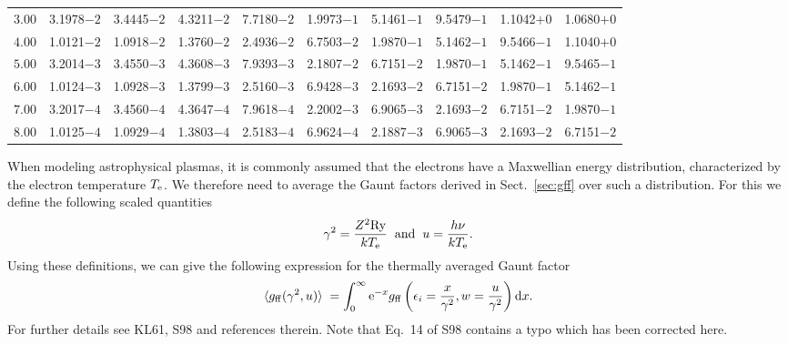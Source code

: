 \documentclass[useAMS,usenatbib]{mn2e}
\begin{document}
\begin{table}
\begin{tabular}{rrrrrrrrrr}
$ 3.00$ & 3.1978$-2$ & 3.4445$-2$ & 4.3211$-2$ & 7.7180$-2$ & 1.9973$-1$ & 5.1461$-1$ & 9.5479$-1$ & 1.1042$+0$ & 1.0680$+0$ \\
$ 4.00$ & 1.0121$-2$ & 1.0918$-2$ & 1.3760$-2$ & 2.4936$-2$ & 6.7503$-2$ & 1.9870$-1$ & 5.1462$-1$ & 9.5466$-1$ & 1.1040$+0$ \\
$ 5.00$ & 3.2014$-3$ & 3.4550$-3$ & 4.3608$-3$ & 7.9393$-3$ & 2.1807$-2$ & 6.7151$-2$ & 1.9870$-1$ & 5.1462$-1$ & 9.5465$-1$ \\
$ 6.00$ & 1.0124$-3$ & 1.0928$-3$ & 1.3799$-3$ & 2.5160$-3$ & 6.9428$-3$ & 2.1693$-2$ & 6.7151$-2$ & 1.9870$-1$ & 5.1462$-1$ \\
$ 7.00$ & 3.2017$-4$ & 3.4560$-4$ & 4.3647$-4$ & 7.9618$-4$ & 2.2002$-3$ & 6.9065$-3$ & 2.1693$-2$ & 6.7151$-2$ & 1.9870$-1$ \\
$ 8.00$ & 1.0125$-4$ & 1.0929$-4$ & 1.3803$-4$ & 2.5183$-4$ & 6.9624$-4$ & 2.1887$-3$ & 6.9065$-3$ & 2.1693$-2$ & 6.7151$-2$ \\
\hline
\end{tabular}
\end{table}

When modeling astrophysical plasmas, it is commonly assumed that the electrons
have a Maxwellian energy distribution, characterized by the electron
temperature $T_{\rm e}$. We therefore need to average the Gaunt factors
derived in Sect.~\ref{sec:gff} over such a distribution. For this we define
the following scaled quantities
\begin{equation}
\gamma^2 = \frac{Z^2 {\rm Ry}}{kT_{\rm e}} \hspace{2mm} {\rm and} \hspace{2mm} u = \frac{h\nu}{kT_{\rm e}}.
\label{basic:avgff}
\end{equation}
Using these definitions, we can give the following expression for the
thermally averaged Gaunt factor
\begin{equation}
\langle g_{\rm ff}(\gamma^2,u)\rangle \; = \int_0^\infty {\rm e}^{-x} g_{\rm ff}\left(\epsilon_i = \frac{x}{\gamma^2},w=\frac{u}{\gamma^2}\right) {\rm d}x.
\label{avgff}
\end{equation}
For further details see KL61, S98 and references therein. Note that Eq.~14 of
S98 contains a typo which has been corrected here.
\end{document}
